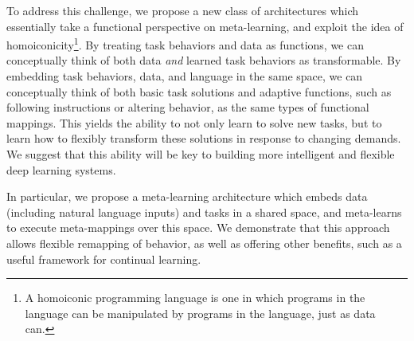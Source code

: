 \documentclass{article}
\begin{document}
To address this challenge, we propose a new class of architectures which essentially take a functional perspective on meta-learning, and exploit the idea of homoiconicity\footnote{A homoiconic programming language is one in which programs in the language can be manipulated by programs in the language, just as data can.}. By treating task behaviors and data as functions, we can conceptually think of both data \emph{and} learned task behaviors as transformable. By embedding task behaviors, data, and language in the same space, we can conceptually think of both basic task solutions and adaptive functions, such as following instructions or altering behavior, as the same types of functional mappings. This yields the ability to not only learn to solve new tasks, but to learn how to flexibly transform these solutions in response to changing demands. We suggest that this ability will be key to building more intelligent and flexible deep learning systems. \par
In particular, we propose a meta-learning architecture which embeds data (including natural language inputs) and tasks in a shared space, and meta-learns to execute meta-mappings over this space. We demonstrate that this approach allows flexible remapping of behavior, as well as offering other benefits, such as a useful framework for continual learning. \par
\end{document}
